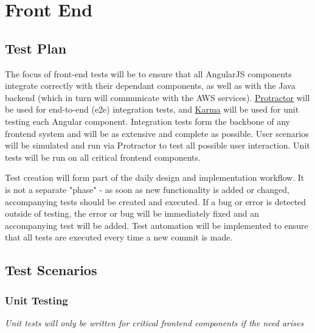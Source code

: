 \documentclass{article}
\begin{document}
\section{Front End}
	\subsection{Test Plan}
	The focus of front-end tests will be to ensure that all AngularJS components integrate correctly with their dependant components, as well as with the Java backend (which in turn will communicate with the AWS services). \href{http://www.protractortest.org/#/}{Protractor} will be used for end-to-end (e2e) integration tests, and \href{https://karma-runner.github.io/1.0/index.html}{Karma} will be used for unit testing each Angular component. Integration tests form the backbone of any frontend system and will be as extensive and complete as possible. User scenarios will be simulated and run via Protractor to test all possible user interaction. Unit tests will be run on all critical frontend components.
	
	Test creation will form part of the daily design and implementation workflow. It is not a separate "phase" - as soon as new functionality is added or changed, accompanying tests should be created and executed. If a bug or error is detected outside of testing, the error or bug will be immediately fixed and an accompanying test will be added. Test automation will be implemented to ensure that all tests are executed every time a new commit is made. 
		
	\subsection{Test Scenarios}
		\subsubsection{Unit Testing}
			\textit{Unit tests will only be written for critical frontend components if the need arises}
\end{document}
